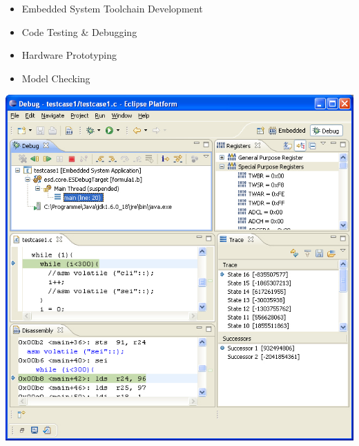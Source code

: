 \begin{block}{\large {}\vphantom{Future}}
\begin{itemize}
    \item Embedded System Toolchain Development
    \item Code Testing \& Debugging
    \item Hardware Prototyping
    \item Model Checking
\end{itemize}
\hspace{350pt}
\vspace{-50pt}
        \includegraphics{figures/overview.jpg}
\end{block}
